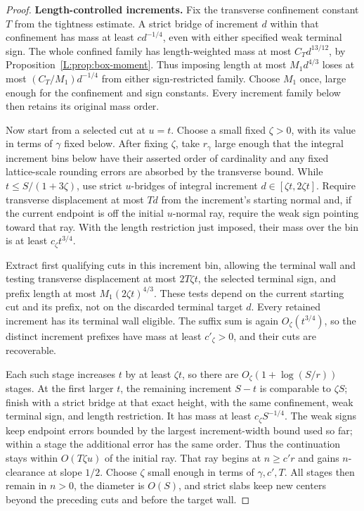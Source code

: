 \begin{proof}
\smallskip\noindent\textbf{Length-controlled increments.}
Fix the transverse confinement constant \(T\) from the tightness
estimate. A strict bridge of increment \(d\) within that confinement
has mass at least \(cd^{-1/4}\), even with either specified weak
terminal sign. The whole confined family has length-weighted mass
at most \(C_Td^{13/12}\), by Proposition~\ref{L:prop:box-moment}.
Thus imposing length at most \(M_1d^{4/3}\) loses at most
\((C_T/M_1)d^{-1/4}\) from either sign-restricted family. Choose
\(M_1\) once, large enough for the confinement and sign constants.
Every increment family below then retains its original mass order.

Now start from a selected cut at \(u=t\). Choose a small fixed
\(\zeta>0\), with its value in terms of \(\gamma\) fixed below.
After fixing \(\zeta\), take \(r_\gamma\) large enough that the integral
increment bins below have their asserted order of cardinality and any
fixed lattice-scale rounding errors are absorbed by the transverse bound.
While \(t\le S/(1+3\zeta)\), use strict \(u\)-bridges
of integral increment \(d\in[\zeta t,2\zeta t]\). Require transverse
displacement at most \(Td\) from the increment's starting normal and,
if the current endpoint is off the initial \(u\)-normal ray, require
the weak sign pointing toward that ray. With the length restriction
just imposed, their mass over the bin is at least
\(c_\zeta t^{3/4}\).

Extract first qualifying cuts in this increment bin, allowing the
terminal wall and testing
transverse displacement at most \(2T\zeta t\), the selected terminal
sign, and prefix length at most \(M_1(2\zeta t)^{4/3}\).
These tests depend on the current starting cut and its prefix, not on
the discarded terminal target \(d\). Every retained increment has
its terminal wall eligible. The suffix sum is again
\(O_\zeta(t^{3/4})\), so the distinct increment prefixes have mass
at least \(c'_\zeta>0\), and their cuts are recoverable.

Each such stage increases \(t\) by at least \(\zeta t\), so there are
\(O_\zeta(1+\log(S/r))\) stages. At the first larger \(t\), the
remaining increment \(S-t\) is comparable to \(\zeta S\); finish
with a strict bridge at that exact height, with the same confinement,
weak terminal sign, and length restriction. It has mass at least
\(c_\zeta S^{-1/4}\). The weak signs keep endpoint errors bounded
by the largest increment-width bound used so far; within a stage the
additional error has the same order. Thus the continuation stays
within \(O(T\zeta u)\) of the initial ray. That ray begins at
\(n\ge c'r\) and gains \(n\)-clearance at slope \(1/2\).
Choose \(\zeta\) small enough in terms of \(\gamma,c',T\).
All stages then remain in \(n>0\), the diameter is \(O(S)\),
and strict slabs keep new centers beyond the preceding cuts and
before the target wall.


\end{proof}
